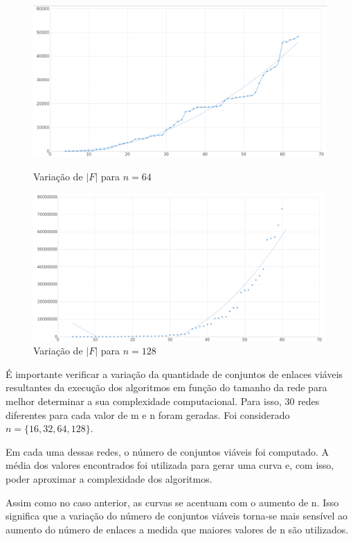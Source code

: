 \begin{figure}[ht]
\begin{minipage}[b]{0.5\linewidth}
    \centering
    \includegraphics[width=1\linewidth]{figs/tamanho64.png} 
    \caption{Variação de $|F|$ para $n=64$} 
    \vspace{4ex}
  \end{minipage}%
  \begin{minipage}[b]{0.5\linewidth}
    \centering
    \includegraphics[width=1\linewidth]{figs/tamanho128.png} 
    \caption{Variação de $|F|$ para $n=128$} 
    \vspace{4ex}
  \end{minipage} 
\end{figure}

É importante verificar a variação da quantidade de conjuntos de enlaces viáveis resultantes da execução dos algoritmos em função do tamanho da rede para melhor determinar a sua complexidade computacional. Para isso, 30 redes diferentes para cada valor de m e n foram geradas. Foi considerado $n=\{16,32,64,128\}$. 

Em cada uma dessas redes, o número de conjuntos viáveis foi computado. A média dos valores encontrados foi utilizada para gerar uma curva e, com isso, poder aproximar a complexidade dos algoritmos.
  
Assim como no caso anterior, as curvas se acentuam com o aumento de n. Isso significa que a variação do número de conjuntos viáveis torna-se mais sensível ao aumento do número de enlaces a medida que maiores valores de n são utilizados. 

